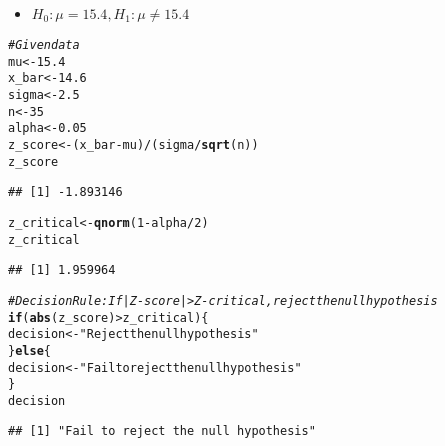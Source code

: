 \documentclass{article}\usepackage[]{graphicx}\usepackage[]{xcolor}
\makeatletter
\newcommand{\hlnum}[1]{\textcolor[rgb]{0.686,0.059,0.569}{#1}}%
\newcommand{\hlsng}[1]{\textcolor[rgb]{0.192,0.494,0.8}{#1}}%
\newcommand{\hlcom}[1]{\textcolor[rgb]{0.678,0.584,0.686}{\textit{#1}}}%
\newcommand{\hlopt}[1]{\textcolor[rgb]{0,0,0}{#1}}%
\newcommand{\hldef}[1]{\textcolor[rgb]{0.345,0.345,0.345}{#1}}%
\newcommand{\hlkwa}[1]{\textcolor[rgb]{0.161,0.373,0.58}{\textbf{#1}}}%
\newcommand{\hlkwb}[1]{\textcolor[rgb]{0.69,0.353,0.396}{#1}}%
\newcommand{\hlkwd}[1]{\textcolor[rgb]{0.737,0.353,0.396}{\textbf{#1}}}%
\newenvironment{kframe}{%
 \def\at@end@of@kframe{}%
 \ifinner\ifhmode%
  \def\at@end@of@kframe{\end{minipage}}%
  \begin{minipage}{\columnwidth}%
 \fi\fi%
 \def\FrameCommand##1{\hskip\@totalleftmargin \hskip-\fboxsep
 \colorbox{shadecolor}{##1}\hskip-\fboxsep
     \hskip-\linewidth \hskip-\@totalleftmargin \hskip\columnwidth}%
 \MakeFramed {\advance\hsize-\width
   \@totalleftmargin\z@ \linewidth\hsize
   \@setminipage}}%
 {\par\unskip\endMakeFramed%
 \at@end@of@kframe}
\newenvironment{knitrout}{}{} %
\makeatother
\begin{document}
\begin{itemize}
  \item $H_0:\mu = 15.4, H_1: \mu \neq 15.4$
\end{itemize}
\begin{knitrout}
\color{fgcolor}\begin{kframe}
\begin{alltt}
\hlcom{# Given data}
\hldef{mu} \hlkwb{<-} \hlnum{15.4}
\hldef{x_bar} \hlkwb{<-} \hlnum{14.6}
\hldef{sigma} \hlkwb{<-} \hlnum{2.5}
\hldef{n} \hlkwb{<-} \hlnum{35}
\hldef{alpha} \hlkwb{<-} \hlnum{0.05}
\hldef{z_score} \hlkwb{<-} \hldef{(x_bar} \hlopt{-} \hldef{mu)} \hlopt{/} \hldef{(sigma} \hlopt{/} \hlkwd{sqrt}\hldef{(n))}
\hldef{z_score}
\end{alltt}
\begin{verbatim}
## [1] -1.893146
\end{verbatim}
\begin{alltt}
\hldef{z_critical} \hlkwb{<-} \hlkwd{qnorm}\hldef{(}\hlnum{1} \hlopt{-} \hldef{alpha} \hlopt{/} \hlnum{2}\hldef{)}
\hldef{z_critical}
\end{alltt}
\begin{verbatim}
## [1] 1.959964
\end{verbatim}
\begin{alltt}
\hlcom{# Decision Rule: If |Z-score| > Z-critical, reject the null hypothesis}
\hlkwa{if} \hldef{(}\hlkwd{abs}\hldef{(z_score)} \hlopt{>} \hldef{z_critical) \{}
  \hldef{decision} \hlkwb{<-} \hlsng{"Reject the null hypothesis"}
\hldef{\}} \hlkwa{else} \hldef{\{}
  \hldef{decision} \hlkwb{<-} \hlsng{"Fail to reject the null hypothesis"}
\hldef{\}}
\hldef{decision}
\end{alltt}
\begin{verbatim}
## [1] "Fail to reject the null hypothesis"
\end{verbatim}
\end{kframe}
\end{knitrout}
\end{document}
